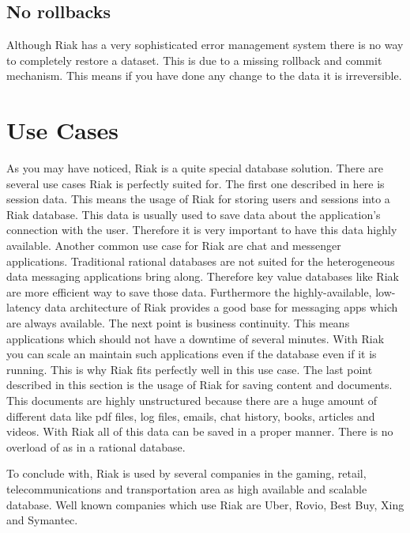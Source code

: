  \subsection{No rollbacks}
 Although Riak has a very sophisticated error management system there is no way to completely restore a dataset. This is due to a missing rollback and commit mechanism. This means if you have done any change to the data it is irreversible.  
 \newpage
 \section{Use Cases}
 As you may have noticed, Riak is a quite special database solution. There are several use cases Riak is perfectly suited for. The first one described in here is session data. This means the usage of Riak for storing users and sessions into a Riak database. This data is usually used to save data  about the application’s connection with the user. Therefore it is very important to have this data highly available.
 Another common use case for Riak are chat and messenger applications. Traditional rational databases are not suited for the heterogeneous data messaging applications bring along. Therefore key value databases like Riak are more efficient way to save those data. Furthermore the highly-available, low-latency data architecture of Riak provides a good base for messaging apps which are always available.
 The next point is business continuity. This means applications which should not have a downtime of several minutes. With Riak you can scale an maintain such applications even if the database even if it is running. This is why Riak fits perfectly well in this use case.
 The last point described in this section is the usage of Riak for saving content and documents. This documents are highly unstructured because there are a huge amount of different data like pdf files, log files, emails, chat history, books, articles and videos. With Riak all of this data can be saved in a proper manner. There is no overload of as in a rational database. \cite{Basho.01.04.17}  
 
 To conclude with, Riak is used by several companies in the gaming, retail, telecommunications and transportation area as high available and scalable database. Well known companies which use Riak are Uber, Rovio, Best Buy, Xing and Symantec. \cite{Basho.01.04.17b}
 
 \newpage